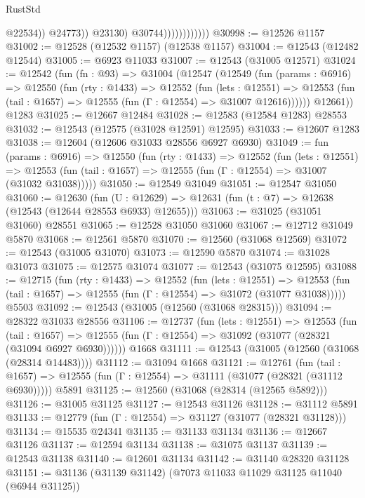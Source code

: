 \begin{lexlean}{RustStd}
\begin{coremodule}
                                      @22534))
                                  @24773))
                              @23130)
                            @30744))))))))))))
@30998 := @12526 @1157
@31002 := @12528 (@12532 @1157) (@12538 @1157)
@31004 := @12543 (@12482 @12544)
@31005 := @6923 @11033
@31007 := @12543 (@31005 @12571)
@31024 := @12542
    (fun (fn : @93) =>
    @31004
      (@12547
        (@12549
          (fun (params : @6916) =>
          @12550
            (fun (rty : @1433) =>
            @12552
              (fun (lets : @12551) =>
              @12553 (fun (tail : @1657) => @12555 (fun (Γ : @12554) => @31007 @12616))))))
        @12661))
    @1283
@31025 := @12667 @12484
@31028 := @12583 (@12584 @1283) @28553
@31032 := @12543 (@12575 (@31028 @12591) @12595)
@31033 := @12607 @1283
@31038 := @12604 (@12606 @31033 @28556 @6927 @6930)
@31049 := fun (params : @6916) =>
  @12550
    (fun (rty : @1433) =>
    @12552
      (fun (lets : @12551) =>
      @12553 (fun (tail : @1657) => @12555 (fun (Γ : @12554) => @31007 (@31032 @31038)))))
@31050 := @12549 @31049
@31051 := @12547 @31050
@31060 := @12630
    (fun (U : @12629) => @12631 (fun (t : @7) => @12638 (@12543 (@12644 @28553 @6933) @12655)))
@31063 := @31025 (@31051 @31060) @28551
@31065 := @12528 @31050 @31060
@31067 := @12712 @31049 @5870
@31068 := @12561 @5870
@31070 := @12560 (@31068 @12569)
@31072 := @12543 (@31005 @31070)
@31073 := @12590 @5870
@31074 := @31028 @31073
@31075 := @12575 @31074
@31077 := @12543 (@31075 @12595)
@31088 := @12715
    (fun (rty : @1433) =>
    @12552
      (fun (lets : @12551) =>
      @12553 (fun (tail : @1657) => @12555 (fun (Γ : @12554) => @31072 (@31077 @31038)))))
    @5503
@31092 := @12543 (@31005 (@12560 (@31068 @28315)))
@31094 := @28322 @31033 @28556
@31106 := @12737
    (fun (lets : @12551) =>
    @12553
      (fun (tail : @1657) =>
      @12555 (fun (Γ : @12554) => @31092 (@31077 (@28321 (@31094 @6927 @6930))))))
    @1668
@31111 := @12543 (@31005 (@12560 (@31068 (@28314 @14483))))
@31112 := @31094 @1668
@31121 := @12761
    (fun (tail : @1657) => @12555 (fun (Γ : @12554) => @31111 (@31077 (@28321 (@31112 @6930)))))
    @5891
@31125 := @12560 (@31068 (@28314 (@12565 @5892)))
@31126 := @31005 @31125
@31127 := @12543 @31126
@31128 := @31112 @5891
@31133 := @12779 (fun (Γ : @12554) => @31127 (@31077 (@28321 @31128)))
@31134 := @15535 @24341
@31135 := @31133 @31134
@31136 := @12667 @31126
@31137 := @12594 @31134
@31138 := @31075 @31137
@31139 := @12543 @31138
@31140 := @12601 @31134
@31142 := @31140 @28320 @31128
@31151 := @31136 (@31139 @31142) (@7073 @11033 @11029 @31125 @11040 (@6944 @31125))

\end{coremodule}
\end{lexlean}
